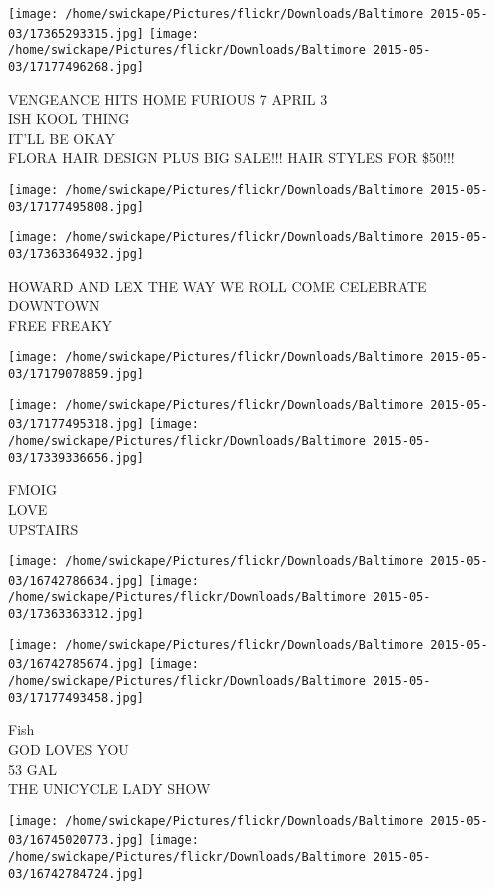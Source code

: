 \documentclass[10pt,letterpaper]{article}
\begin{document}
\texttt{[image: /home/swickape/Pictures/flickr/Downloads/Baltimore 2015-05-03/17365293315.jpg]}
\texttt{[image: /home/swickape/Pictures/flickr/Downloads/Baltimore 2015-05-03/17177496268.jpg]}

VENGEANCE HITS HOME FURIOUS 7 APRIL 3\\
ISH KOOL THING\\
IT'LL BE OKAY\\
FLORA HAIR DESIGN PLUS BIG SALE!!!  HAIR STYLES FOR \$50!!!
\pagebreak

\texttt{[image: /home/swickape/Pictures/flickr/Downloads/Baltimore 2015-05-03/17177495808.jpg]}

\vspace{0.25in}
\texttt{[image: /home/swickape/Pictures/flickr/Downloads/Baltimore 2015-05-03/17363364932.jpg]}

HOWARD AND LEX THE WAY WE ROLL COME CELEBRATE DOWNTOWN\\
FREE FREAKY
\pagebreak

\texttt{[image: /home/swickape/Pictures/flickr/Downloads/Baltimore 2015-05-03/17179078859.jpg]}

\vspace{0.25in}
\texttt{[image: /home/swickape/Pictures/flickr/Downloads/Baltimore 2015-05-03/17177495318.jpg]}
\texttt{[image: /home/swickape/Pictures/flickr/Downloads/Baltimore 2015-05-03/17339336656.jpg]}

FMOIG\\
LOVE\\
UPSTAIRS
\pagebreak

\texttt{[image: /home/swickape/Pictures/flickr/Downloads/Baltimore 2015-05-03/16742786634.jpg]}
\texttt{[image: /home/swickape/Pictures/flickr/Downloads/Baltimore 2015-05-03/17363363312.jpg]}

\texttt{[image: /home/swickape/Pictures/flickr/Downloads/Baltimore 2015-05-03/16742785674.jpg]}
\texttt{[image: /home/swickape/Pictures/flickr/Downloads/Baltimore 2015-05-03/17177493458.jpg]}

Fish\\
GOD LOVES YOU\\
53 GAL\\
THE UNICYCLE LADY SHOW
\pagebreak

\texttt{[image: /home/swickape/Pictures/flickr/Downloads/Baltimore 2015-05-03/16745020773.jpg]}
\texttt{[image: /home/swickape/Pictures/flickr/Downloads/Baltimore 2015-05-03/16742784724.jpg]}
\end{document}
